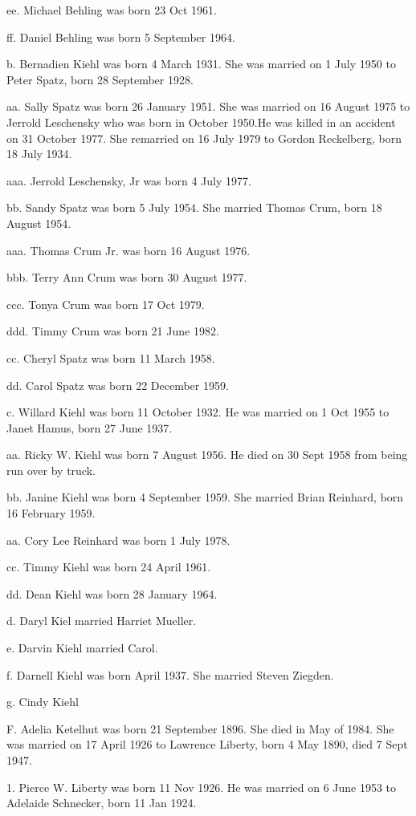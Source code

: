 \documentclass[a4paper]{article}
\begin{document}
ee. Michael Behling was born 23 Oct 1961.

ff. Daniel Behling was born 5 September 1964.

b. Bernadien Kiehl was born 4 March 1931.   She was married on 1 July 1950 to Peter Spatz, born 28 September 1928.

aa. Sally Spatz was born 26 January 1951.  She was married on 16 August 1975 to Jerrold Leschensky who was born in October 1950.He was killed in an accident on 31 October 1977. She remarried	on 16 July 1979 to Gordon Reckelberg, born 18 July 1934.

aaa. Jerrold Leschensky, Jr was born 4 July 1977.

bb. Sandy Spatz was born 5 July 1954.  She married Thomas Crum, born 18 August 1954.

aaa. Thomas Crum Jr. was born 16 August 1976.

bbb. Terry Ann Crum was born 30 August 1977.

ccc. Tonya Crum was  born 17 Oct 1979.

ddd. Timmy Crum was born 21 June 1982.

cc. Cheryl Spatz was born 11 March 1958.

dd. Carol Spatz was born 22 December 1959.

c. Willard Kiehl was born 11 October 1932.  He was married on 1 Oct 1955 to Janet Hamus, born 27 June 1937.

aa. Ricky W. Kiehl was born 7 August 1956.  He died on 30 Sept 1958 from being run over by truck.

bb. Janine Kiehl was born 4 September 1959.  She married Brian Reinhard, born 16 February 1959.

aa. Cory Lee Reinhard was born 1 July 1978.

cc. Timmy Kiehl was born 24 April 1961.

dd. Dean Kiehl was born 28 January 1964.

d. Daryl Kiel married Harriet Mueller.

e. Darvin Kiehl married Carol.

f. Darnell Kiehl was born April 1937.  She married Steven Ziegden.

g. Cindy Kiehl

F. Adelia Ketelhut was born 21 September 1896.  She died in May of 1984.  She was married on 17 April 1926 to Lawrence Liberty, born 4 May 1890, died 7 Sept 1947.

1. Pierce W. Liberty was born 11 Nov 1926.  He was married on 6 June 1953 to Adelaide Schnecker, born 11 Jan 1924.
\end{document}
